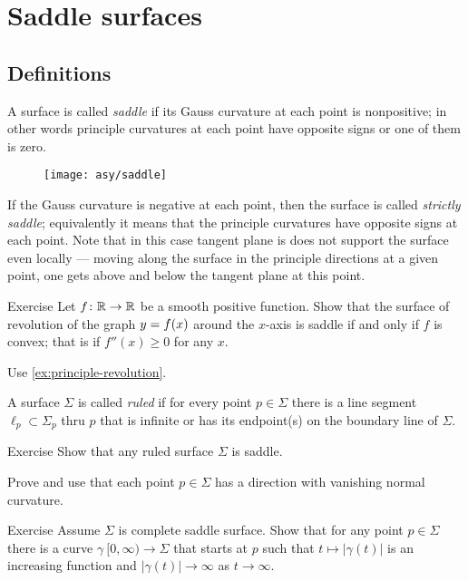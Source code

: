\chapter{Saddle surfaces}

\section*{Definitions}

A surface is called \emph{saddle} if its Gauss curvature at each point is nonpositive;
in other words principle curvatures at each point have opposite signs or one of them is zero.

\begin{wrapfigure}{r}{40 mm}
\vskip-0mm
\centering
\texttt{[image: asy/saddle]}
\vskip0mm
\end{wrapfigure}

If the Gauss curvature is negative at each point,
then the surface is called \emph{strictly saddle};
equivalently it means that the principle curvatures have opposite signs at each point.
Note that in this case tangent plane is does not support the surface even locally --- moving along the surface in the principle directions at a given point, one gets above and below the tangent plane at this point.  


\begin{thm}{Exercise}\label{ex:convex-revolution}
Let $f\colon\mathbb{R}\to\mathbb{R}$ be a smooth positive function.
Show that the surface of revolution of the graph $y\z=f(x)$ around the $x$-axis
 is saddle if and only if $f$ is convex; that is if $f''(x)\ge0$ for any $x$.
\end{thm}

 Use \ref{ex:principle-revolution}.

A surface $\Sigma$ is called \emph{ruled} if for every point $p\in \Sigma$ there is a line segment $\ell_p\subset \Sigma_p$ thru $p$ that is infinite or has its endpoint(s) on the boundary line of $\Sigma$.

\begin{thm}{Exercise}
Show that any ruled surface $\Sigma$ is saddle.
\end{thm}

 Prove and use that each point $p\in\Sigma$ has a direction with vanishing normal curvature.

\begin{thm}{Exercise}
Assume $\Sigma$ is complete saddle surface.
Show that for any point $p\in \Sigma$ there is a curve $\gamma\:[0,\infty)\to\Sigma$ that starts at $p$
such that $t\mapsto|\gamma(t)|$ is an increasing function and $|\gamma(t)|\to\infty$ as $t\to\infty$.
\end{thm}

